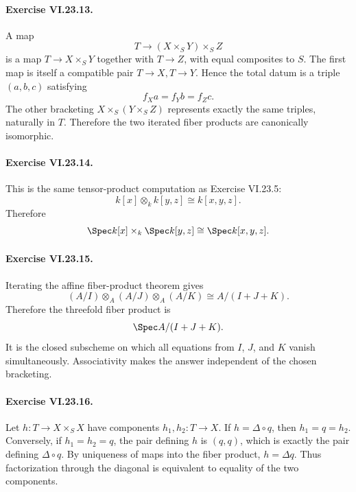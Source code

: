 \paragraph{Exercise VI.23.13.}
\begin{solution}
A map
\[
T\to (X\times_SY)\times_SZ
\]
is a map $T\to X\times_SY$ together with $T\to Z$, with equal composites to $S$.  The first map
is itself a compatible pair $T\to X,T\to Y$.  Hence the total datum is a triple
$(a,b,c)$ satisfying
\[
f_Xa=f_Yb=f_Zc.
\]
The other bracketing $X\times_S(Y\times_SZ)$ represents exactly the same triples, naturally in
$T$.  Therefore the two iterated fiber products are canonically isomorphic.
\end{solution}

\paragraph{Exercise VI.23.14.}
\begin{solution}
This is the same tensor-product computation as Exercise VI.23.5:
\[
k[x]\otimes_k k[y,z]\cong k[x,y,z].
\]
Therefore
\[
\Spec k[x]\times_k\Spec k[y,z]\cong\Spec k[x,y,z].
\]
\end{solution}

\paragraph{Exercise VI.23.15.}
\begin{solution}
Iterating the affine fiber-product theorem gives
\[
(A/I)\otimes_A(A/J)\otimes_A(A/K)
\cong A/(I+J+K).
\]
Therefore the threefold fiber product is
\[
\Spec A/(I+J+K).
\]
It is the closed subscheme on which all equations from $I$, $J$, and $K$ vanish simultaneously.
Associativity makes the answer independent of the chosen bracketing.
\end{solution}

\paragraph{Exercise VI.23.16.}
\begin{solution}
Let $h:T\to X\times_SX$ have components $h_1,h_2:T\to X$.
If $h=\Delta\circ q$, then $h_1=q=h_2$.  Conversely, if $h_1=h_2=q$, the pair defining $h$
is $(q,q)$, which is exactly the pair defining $\Delta\circ q$.  By uniqueness of maps into the
fiber product, $h=\Delta q$.  Thus factorization through the diagonal is equivalent to equality
of the two components.
\end{solution}

